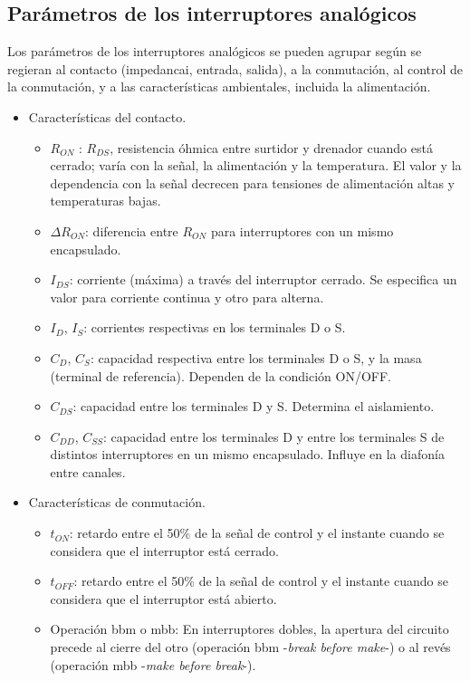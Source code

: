 \subsection{Parámetros de los interruptores analógicos}

Los parámetros de los interruptores analógicos se pueden agrupar según se regieran al contacto (impedancai, entrada, salida), a la conmutación, al control de la conmutación, y a las características ambientales, incluida la alimentación.

\begin{itemize}
    \item Características del contacto.
    \begin{itemize}
        \item $R_{ON}$ : $R_{DS}$, resistencia óhmica entre surtidor y drenador cuando está cerrado; varía con la señal, la alimentación y la temperatura. El valor y la dependencia con la señal decrecen para tensiones de alimentación altas y temperaturas bajas.
        \item $\Delta R_{ON}$: diferencia entre $R_{ON}$ para interruptores con un mismo encapsulado.
        \item $I_{DS}$: corriente (máxima) a través del interruptor cerrado. Se especifica un valor para corriente continua y otro para alterna.
        \item $I_D$, $I_S$: corrientes respectivas en los terminales D o S.
        \item $C_D$, $C_S$: capacidad respectiva entre los terminales D o S, y la masa (terminal de referencia). Dependen de la condición ON/OFF.
        \item $C_{DS}$: capacidad entre los terminales D y S. Determina el aislamiento.
        \item $C_{DD}$, $C_{SS}$: capacidad entre los terminales D y entre los terminales S de distintos interruptores en un mismo encapsulado. Influye en la diafonía entre canales.
    \end{itemize}
    \item Características de conmutación.
    \begin{itemize}
        \item $t_{ON}$: retardo entre el 50\% de la señal de control y el instante cuando se considera que el interruptor está cerrado.
        \item $t_{OFF}$: retardo entre el 50\% de la señal de control y el instante cuando se considera que el interruptor está abierto. 
        \item Operación bbm o mbb: En interruptores dobles, la apertura del circuito precede al cierre del otro (operación bbm -\textit{break before make}-) o al revés (operación mbb -\textit{make before break}-).

\end{itemize}
\end{itemize}
